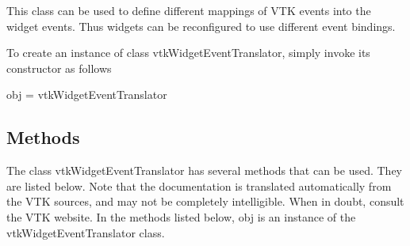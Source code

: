 This class can be used to define different mappings of V\-T\-K events into the widget events. Thus widgets can be reconfigured to use different event bindings.

To create an instance of class vtk\-Widget\-Event\-Translator, simply invoke its constructor as follows \begin{DoxyVerb}  obj = vtkWidgetEventTranslator
\end{DoxyVerb}
 \hypertarget{vtkwidgets_vtkxyplotwidget_Methods}{}\subsection{Methods}\label{vtkwidgets_vtkxyplotwidget_Methods}
The class vtk\-Widget\-Event\-Translator has several methods that can be used. They are listed below. Note that the documentation is translated automatically from the V\-T\-K sources, and may not be completely intelligible. When in doubt, consult the V\-T\-K website. In the methods listed below, {\ttfamily obj} is an instance of the vtk\-Widget\-Event\-Translator class. 
